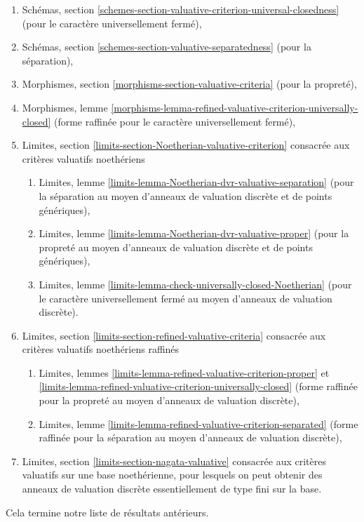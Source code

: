 \begin{enumerate}
\item Schémas, section
\ref{schemes-section-valuative-criterion-universal-closedness}
(pour le caractère universellement fermé),
\item Schémas, section \ref{schemes-section-valuative-separatedness}
(pour la séparation),
\item Morphismes, section \ref{morphisms-section-valuative-criteria}
(pour la propreté),
\item Morphismes, lemme
\ref{morphisms-lemma-refined-valuative-criterion-universally-closed}
(forme raffinée pour le caractère universellement fermé),
\item Limites, section \ref{limits-section-Noetherian-valuative-criterion}
consacrée aux critères valuatifs noethériens
\begin{enumerate}
\item Limites, lemme \ref{limits-lemma-Noetherian-dvr-valuative-separation}
(pour la séparation au moyen d'anneaux de valuation discrète et de points génériques),
\item Limites, lemme \ref{limits-lemma-Noetherian-dvr-valuative-proper}
(pour la propreté au moyen d'anneaux de valuation discrète et de points génériques),
\item Limites, lemme \ref{limits-lemma-check-universally-closed-Noetherian}
(pour le caractère universellement fermé au moyen d'anneaux de valuation discrète).
\end{enumerate}
\item Limites, section \ref{limits-section-refined-valuative-criteria}
consacrée aux critères valuatifs noethériens raffinés
\begin{enumerate}
\item Limites, lemmes
\ref{limits-lemma-refined-valuative-criterion-proper} et
\ref{limits-lemma-refined-valuative-criterion-universally-closed}
(forme raffinée pour la propreté au moyen d'anneaux de valuation discrète),
\item Limites, lemme \ref{limits-lemma-refined-valuative-criterion-separated}
(forme raffinée pour la séparation au moyen d'anneaux de valuation discrète),
\end{enumerate}
\item Limites, section \ref{limits-section-nagata-valuative}
consacrée aux critères valuatifs sur une base noethérienne, pour lesquels
on peut obtenir des anneaux de valuation discrète essentiellement de type fini
sur la base.
\end{enumerate}
Cela termine notre liste de résultats antérieurs.

